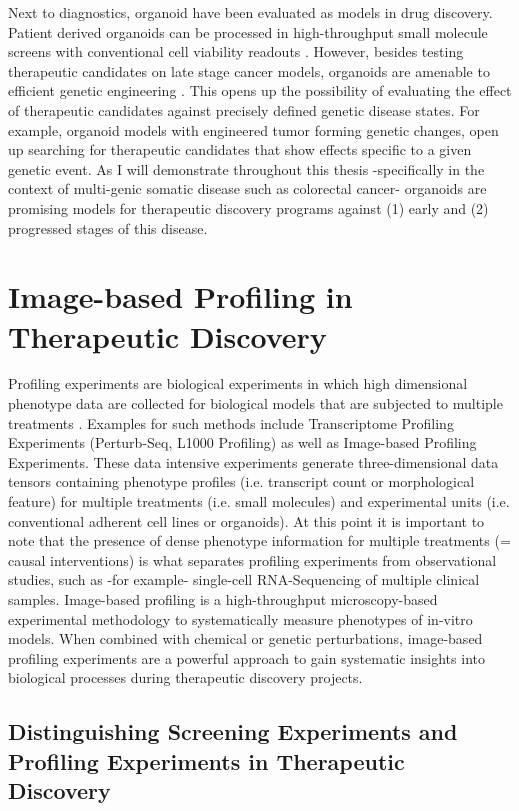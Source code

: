 \begin{flushleft}
Next to diagnostics, organoid have been evaluated as models in drug discovery. Patient derived organoids can be processed in high-throughput small molecule screens with conventional cell viability readouts \cite{VanDeWetering2015}. However, besides testing therapeutic candidates on late stage cancer models, organoids are amenable to efficient genetic engineering \cite{Matano2015-zw, Drost2017-fu}. This opens up the possibility of evaluating the effect of therapeutic candidates against precisely defined genetic disease states. For example, organoid models with engineered tumor forming genetic changes, open up searching for therapeutic candidates that show effects specific to a given genetic event. As I will demonstrate throughout this thesis -specifically in the context of multi-genic somatic disease such as colorectal cancer- organoids are promising models for therapeutic discovery programs against (1) early and (2) progressed stages of this disease.

\section{Image-based Profiling in Therapeutic Discovery} 

Profiling experiments are biological experiments in which high dimensional phenotype data are collected for biological models that are subjected to multiple treatments \cite{chandrasekaranImagebasedProfilingDrug2021}. Examples for such methods include Transcriptome Profiling Experiments (Perturb-Seq, L1000 Profiling) as well as Image-based Profiling Experiments. These data intensive experiments generate three-dimensional data tensors containing phenotype profiles (i.e. transcript count or morphological feature) for multiple treatments (i.e. small molecules) and experimental units (i.e. conventional adherent cell lines or organoids). At this point it is important to note that the presence of dense phenotype information for multiple treatments (= causal interventions) is what separates profiling experiments from observational studies, such as -for example- single-cell RNA-Sequencing of multiple clinical samples. Image-based profiling is a high-throughput microscopy-based experimental methodology to systematically measure phenotypes of in-vitro models. When combined with chemical or genetic perturbations, image-based profiling experiments are a powerful approach to gain systematic insights into biological processes during therapeutic discovery projects. 

\subsection{Distinguishing Screening Experiments and Profiling Experiments in Therapeutic Discovery}


\end{flushleft}
